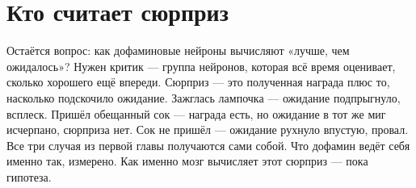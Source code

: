 \section*{Кто считает сюрприз}

Остаётся вопрос: как дофаминовые нейроны вычисляют «лучше, чем ожидалось»? Нужен критик --- группа нейронов, которая всё время оценивает, сколько хорошего ещё впереди. Сюрприз --- это полученная награда плюс то, насколько подскочило ожидание. Зажглась лампочка --- ожидание подпрыгнуло, всплеск. Пришёл обещанный сок --- награда есть, но ожидание в тот же миг исчерпано, сюрприза нет. Сок не пришёл --- ожидание рухнуло впустую, провал. Все три случая из первой главы получаются сами собой. Что дофамин ведёт себя именно так, измерено. Как именно мозг вычисляет этот сюрприз --- пока гипотеза.

